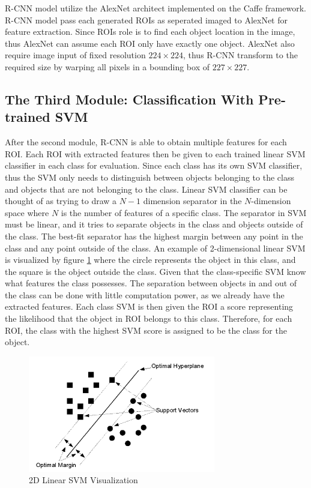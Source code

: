 R-CNN model utilize the AlexNet architect implemented on the Caffe framework. R-CNN model pass each generated ROIs as seperated imaged to AlexNet for feature extraction. Since ROIs role is to find each object location in the image, thus AlexNet can assume each ROI only have exactly one object. AlexNet also require image input of fixed resolution $224 \times 224$, thus R-CNN transform to the required size by warping all pixels in a bounding box of $227 \times 227$.

\subsection{The Third Module: Classification With Pre-trained SVM}
After the second module, R-CNN is able to obtain multiple features for each ROI. Each ROI with extracted features then be given to each trained linear SVM classifier in each class for evaluation. Since each class has its own SVM classifier, thus the SVM only needs to distinguish between objects belonging to the class and objects that are not belonging to the class. Linear SVM classifier can be thought of as trying to draw a $N-1$ dimension separator in the $N$-dimension space where $N$ is the number of features of a specific class. The separator in SVM must be linear, and it tries to separate objects in the class and objects outside of the class. The best-fit separator has the highest margin between any point in the class and any point outside of the class. An example of 2-dimensional linear SVM is visualized by figure \ref{fig:2d_svm_viz} where the circle represents the object in this class, and the square is the object outside the class. Given that the class-specific SVM know what features the class possesses. The separation between objects in and out of the class can be done with little computation power, as we already have the extracted features. Each class SVM is then given the ROI a score representing the likelihood that the object in ROI belongs to this class. Therefore, for each ROI, the class with the highest SVM score is assigned to be the class for the object.

\begin{figure}[!ht]
    \centering
    \includegraphics[height=2in]{figures/2d_svm.png}
    \caption{2D Linear SVM Visualization \cite{2d_svm_Tzotsos}} \label{fig:2d_svm_viz}
\end{figure}

